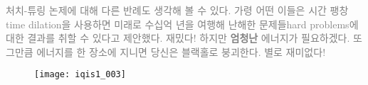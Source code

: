 \documentclass[a4paper,chapter,kosection,atbegshi,hidelinks,itemph]{oblivoir}
\begin{document}
\hfill\break

\hfill\parbox[t]{9cm}{\textcolor{gray}{ 처치-튜링 논제에 대해 다른
반례도 생각해 볼 수 있다. 가령 어떤 이들은 시간 팽창{\footnotesize time 
dilation}을 사용하면 미래로 수십억 년을 여행해 난해한 문제들{\footnotesize hard
problems}에 대한 결과를 취할 수 있다고 제안했다. 재밌다! 하지만 \textbf{엄청난}
에너지가 필요하겠다. 또 그만큼 에너지를 한 장소에 지니면 당신은 블랙홀로
붕괴한다. 별로 재미없다!}}

\hfill\break

\begin{figure}[h]
    \centering
    \texttt{[image: iqis1\_003]}
\end{figure}
\end{document}
